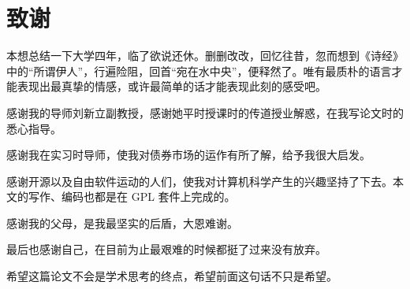 \chapter{致谢}

本想总结一下大学四年，临了欲说还休。删删改改，回忆往昔，忽而想到《诗经》中的“所谓伊人”，行遍险阻，回首“宛在水中央”，便释然了。唯有最质朴的语言才能表现出最真挚的情感，或许最简单的话才能表现此刻的感受吧。

感谢我的导师刘新立副教授，感谢她平时授课时的传道授业解惑，在我写论文时的悉心指导。

感谢我在实习时导师，使我对债券市场的运作有所了解，给予我很大启发。

感谢开源以及自由软件运动的人们，使我对计算机科学产生的兴趣坚持了下去。本文的写作、编码也都是在 GPL 套件上完成的。

感谢我的父母，是我最坚实的后盾，大恩难谢。

最后也感谢自己，在目前为止最艰难的时候都挺了过来没有放弃。

希望这篇论文不会是学术思考的终点，希望前面这句话不只是希望。
